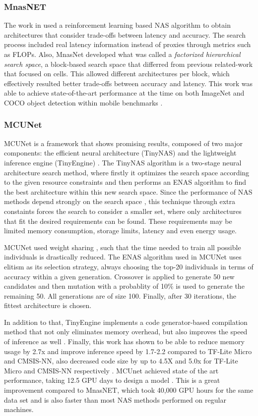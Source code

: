 \documentclass[10pt,        %
               a4paper,     %
               journal,     %
               ]{IEEEtran}
\begin{document}
\subsubsection{\textbf{MnasNET}}
The work in \cite{tan2019mnasnet} used a reinforcement learning based NAS algorithm to obtain architectures that
consider trade-offs between latency and accuracy. The search process included real latency information instead of
proxies through metrics such as FLOPs. Also, MnasNet developed what was called a
\textit{factorized hierarchical search space}, a block-based search space that differred from previous related-work that
focused on cells. This allowed different architectures per block, which effectively resulted better trade-offs between
accuracy and latency.
This work was able
to achieve state-of-the-art performance at the time on both ImageNet and COCO object detection within
mobile benchmarks \cite{tan2019mnasnet}.

\subsubsection{\textbf{MCUNet}}
MCUNet is a framework that shows promising results, composed of
two major components: the efficient neural architecture (TinyNAS) and the lightweight inference engine (TinyEngine) \cite{lin2020mcunet}.
The TinyNAS algorithm is a two-stage neural architecture search method, where firstly it optimizes the search space according to the
given resource constraints and then performs an ENAS algorithm to find the best architecture within this new search space.
Since the performance of NAS methods depend strongly on the search space \cite{radosavovic2020designing}, this technique
through extra constaints forces the search to consider a smaller set, where only architectures that fit the desired requirements
can be found. These requirements may be limited memory consumption, storage limits, latency and even energy usage.

MCUNet used weight sharing \cite{lin2020mcunet}, such that the time needed to train all possible individuals is drastically
reduced. The ENAS algorithm used in MCUNet uses elitism as its selection strategy, always choosing the top-20 individuals in
terms of accuracy within a given generation. Crossover is applied to generate 50 new candidates and then mutation with a
probablity of 10\% is used to generate the remaining 50. All generations are of size 100. Finally, after 30 iterations,
the fittest architecture is chosen.

In addition to that, TinyEngine implements a code generator-based compilation method that not only eliminates memory overhead, but also improves
the speed of inference as well \cite{lin2020mcunet}.
Finally, this work has shown to be able to
reduce memory usage by 2.7x and improve inference speed by 1.7-2.2
compared to TF-Lite Micro and CMSIS-NN, also decreased code size by up to 4.5X and 5.0x for TF-Lite Micro and CMSIS-NN
respectively \cite{lin2020mcunet}. MCUnet achieved state of the art performance, taking 12.5 GPU days to design a model
\cite{lin2020mcunet}. This is a great improvement compared to MnasNET, which took 40,000 GPU hours for the same
data set \cite{tan2019mnasnet} and is also faster than most NAS methods performed on regular machines.
\end{document}
